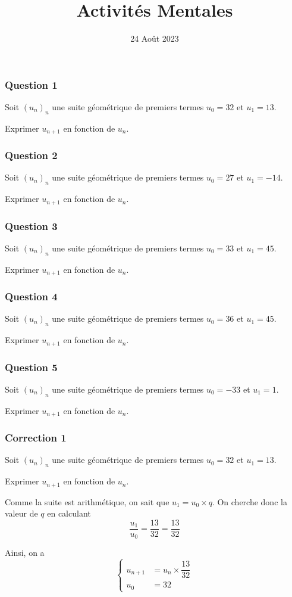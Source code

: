 \documentclass[15pt, mathserif]{beamer}
\title{Activités Mentales}
\date{24 Août 2023}
\begin{document}
\begin{frame}
    \titlepage
\end{frame}

\begin{frame} 
	\frametitle{Question 1}
Soit $(u_n)_n$ une suite géométrique de premiers termes $u_0=32$ et $u_1=13$. 
 
 Exprimer $u_{n+1}$ en fonction de $u_n$.\end{frame}


\begin{frame} 
	\frametitle{Question 2}
Soit $(u_n)_n$ une suite géométrique de premiers termes $u_0=27$ et $u_1=-14$. 
 
 Exprimer $u_{n+1}$ en fonction de $u_n$.\end{frame}


\begin{frame} 
	\frametitle{Question 3}
Soit $(u_n)_n$ une suite géométrique de premiers termes $u_0=33$ et $u_1=45$. 
 
 Exprimer $u_{n+1}$ en fonction de $u_n$.\end{frame}


\begin{frame} 
	\frametitle{Question 4}
Soit $(u_n)_n$ une suite géométrique de premiers termes $u_0=36$ et $u_1=45$. 
 
 Exprimer $u_{n+1}$ en fonction de $u_n$.\end{frame}


\begin{frame} 
	\frametitle{Question 5}
Soit $(u_n)_n$ une suite géométrique de premiers termes $u_0=-33$ et $u_1=1$. 
 
 Exprimer $u_{n+1}$ en fonction de $u_n$.\end{frame}


\begin{frame}
\vspace{-10mm}
	\frametitle{Correction 1}
Soit $(u_n)_n$ une suite géométrique de premiers termes $u_0=32$ et $u_1=13$. 
 
 Exprimer $u_{n+1}$ en fonction de $u_n$. 
 
 \vspace*{1cm} 
 
 Comme la suite est arithmétique, on sait que $u_1=u_0\times q$. On cherche donc la valeur de $q$ en calculant $$\dfrac{u_1}{u_0}=\dfrac{13}{32}=\dfrac{13}{32}$$ 
 
 Ainsi, on a $$ \left\{ 
 \begin{array}{ll} 
 u_{n+1} &= u_n \times \dfrac{13}{32} \\ 
 u_0 & = 32 
 \end{array} 
 \right. $$ 
 \end{frame}
\end{document}
